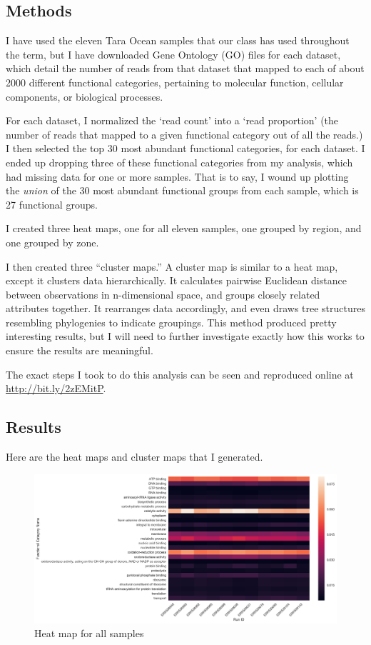 \documentclass[12pt,a4paper,twocolumn]{article}
\begin{document}
\subsection{Methods}\label{methods}

I have used the eleven Tara Ocean samples that our class has used
throughout the term, but I have downloaded Gene Ontology (GO) files for
each dataset, which detail the number of reads from that dataset that
mapped to each of about 2000 different functional categories, pertaining
to molecular function, cellular components, or biological processes.

For each dataset, I normalized the `read count' into a `read proportion'
(the number of reads that mapped to a given functional category out of
all the reads.) I then selected the top 30 most abundant functional
categories, for each dataset. I ended up dropping three of these
functional categories from my analysis, which had missing data for one
or more samples. That is to say, I wound up plotting the \emph{union} of
the 30 most abundant functional groups from each sample, which is 27
functional groups.

I created three heat maps, one for all eleven samples, one grouped by
region, and one grouped by zone.

I then created three ``cluster maps.'' A cluster map is similar to a
heat map, except it clusters data hierarchically. It calculates pairwise
Euclidean distance between observations in n-dimensional space, and
groups closely related attributes together. It rearranges data
accordingly, and even draws tree structures resembling phylogenies to
indicate groupings. This method produced pretty interesting results, but
I will need to further investigate exactly how this works to ensure the
results are meaningful.

The exact steps I took to do this analysis can be seen and reproduced
online at \url{http://bit.ly/2zEMitP}.

\subsection{Results}\label{results}

Here are the heat maps and cluster maps that I generated.

\begin{figure}
\centering
\includegraphics{imgs/heat/heat_all.png}
\caption{Heat map for all samples\label{fig:heat_all}}
\end{figure}
\end{document}
